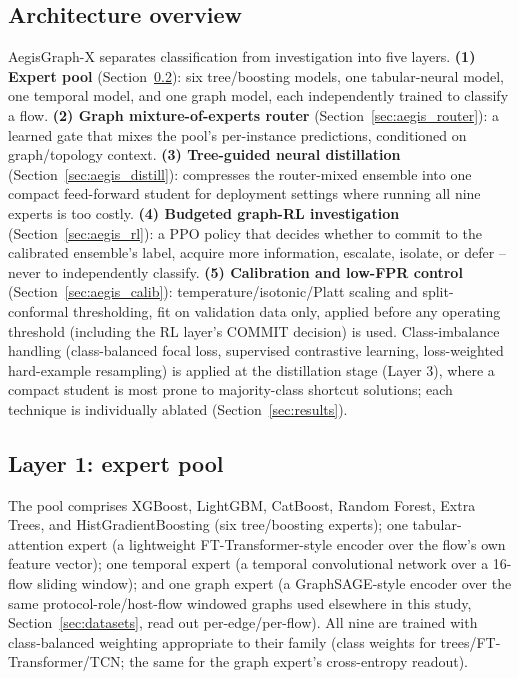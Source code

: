 \documentclass[journal]{IEEEtran}
\begin{document}
\subsection{Architecture overview}
AegisGraph-X separates classification from investigation into five layers.
\textbf{(1) Expert pool} (Section~\ref{sec:aegis_experts}): six tree/boosting
models, one tabular-neural model, one temporal model, and one graph model,
each independently trained to classify a flow. \textbf{(2) Graph
mixture-of-experts router} (Section~\ref{sec:aegis_router}): a learned gate
that mixes the pool's per-instance predictions, conditioned on graph/topology
context. \textbf{(3) Tree-guided neural distillation} (Section~\ref{sec:aegis_distill}):
compresses the router-mixed ensemble into one compact feed-forward student
for deployment settings where running all nine experts is too costly.
\textbf{(4) Budgeted graph-RL investigation} (Section~\ref{sec:aegis_rl}): a
PPO policy that decides whether to commit to the calibrated ensemble's
label, acquire more information, escalate, isolate, or defer -- never to
independently classify. \textbf{(5) Calibration and low-FPR control}
(Section~\ref{sec:aegis_calib}): temperature/isotonic/Platt scaling and
split-conformal thresholding, fit on validation data only, applied before any
operating threshold (including the RL layer's COMMIT decision) is used.
Class-imbalance handling (class-balanced focal loss, supervised contrastive
learning, loss-weighted hard-example resampling) is applied at the
distillation stage (Layer 3), where a compact student is most prone to
majority-class shortcut solutions; each technique is individually ablated
(Section~\ref{sec:results}).

\subsection{Layer 1: expert pool}
\label{sec:aegis_experts}
The pool comprises XGBoost, LightGBM, CatBoost, Random Forest, Extra Trees,
and HistGradientBoosting (six tree/boosting experts); one tabular-attention
expert (a lightweight FT-Transformer-style encoder over the flow's own
feature vector); one temporal expert (a temporal convolutional network over
a 16-flow sliding window); and one graph expert (a GraphSAGE-style encoder
over the same protocol-role/host-flow windowed graphs used elsewhere in this
study, Section~\ref{sec:datasets}, read out per-edge/per-flow). All nine are
trained with class-balanced weighting appropriate to their family (class
weights for trees/FT-Transformer/TCN; the same for the graph expert's
cross-entropy readout).
\end{document}
